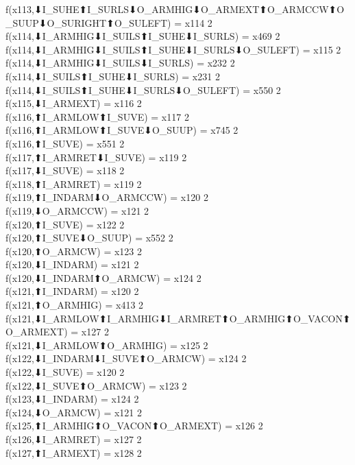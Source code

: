 f(x113,⬇I_SUHE⬆I_SURLS⬇O_ARMHIG⬇O_ARMEXT⬆O_ARMCCW⬆O_SUUP⬇O_SURIGHT⬆O_SULEFT) = x114 {2} \\
f(x114,⬇I_ARMHIG⬇I_SUILS⬆I_SUHE⬇I_SURLS) = x469 {2} \\
f(x114,⬇I_ARMHIG⬇I_SUILS⬆I_SUHE⬇I_SURLS⬇O_SULEFT) = x115 {2} \\
f(x114,⬇I_ARMHIG⬇I_SUILS⬇I_SURLS) = x232 {2} \\
f(x114,⬇I_SUILS⬆I_SUHE⬇I_SURLS) = x231 {2} \\
f(x114,⬇I_SUILS⬆I_SUHE⬇I_SURLS⬇O_SULEFT) = x550 {2} \\
f(x115,⬇I_ARMEXT) = x116 {2} \\
f(x116,⬆I_ARMLOW⬆I_SUVE) = x117 {2} \\
f(x116,⬆I_ARMLOW⬆I_SUVE⬇O_SUUP) = x745 {2} \\
f(x116,⬆I_SUVE) = x551 {2} \\
f(x117,⬆I_ARMRET⬇I_SUVE) = x119 {2} \\
f(x117,⬇I_SUVE) = x118 {2} \\
f(x118,⬆I_ARMRET) = x119 {2} \\
f(x119,⬆I_INDARM⬇O_ARMCCW) = x120 {2} \\
f(x119,⬇O_ARMCCW) = x121 {2} \\
f(x120,⬆I_SUVE) = x122 {2} \\
f(x120,⬆I_SUVE⬇O_SUUP) = x552 {2} \\
f(x120,⬆O_ARMCW) = x123 {2} \\
f(x120,⬇I_INDARM) = x121 {2} \\
f(x120,⬇I_INDARM⬆O_ARMCW) = x124 {2} \\
f(x121,⬆I_INDARM) = x120 {2} \\
f(x121,⬆O_ARMHIG) = x413 {2} \\
f(x121,⬇I_ARMLOW⬆I_ARMHIG⬇I_ARMRET⬆O_ARMHIG⬆O_VACON⬆O_ARMEXT) = x127 {2} \\
f(x121,⬇I_ARMLOW⬆O_ARMHIG) = x125 {2} \\
f(x122,⬇I_INDARM⬇I_SUVE⬆O_ARMCW) = x124 {2} \\
f(x122,⬇I_SUVE) = x120 {2} \\
f(x122,⬇I_SUVE⬆O_ARMCW) = x123 {2} \\
f(x123,⬇I_INDARM) = x124 {2} \\
f(x124,⬇O_ARMCW) = x121 {2} \\
f(x125,⬆I_ARMHIG⬆O_VACON⬆O_ARMEXT) = x126 {2} \\
f(x126,⬇I_ARMRET) = x127 {2} \\
f(x127,⬆I_ARMEXT) = x128 {2} \\
